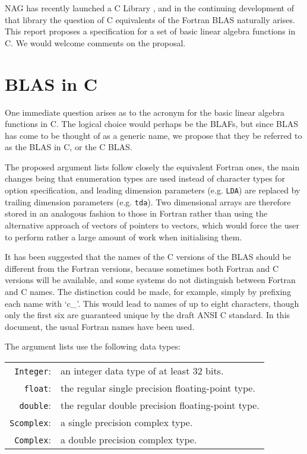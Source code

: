 NAG has recently launched a C Library \cite{CLIB}, and in the continuing
development of that library the question of C equivalents of the Fortran
BLAS naturally arises. This report proposes a specification for a set of
basic linear algebra functions in C.  We would welcome comments on the
proposal. 

\section{BLAS in C}
One immediate question arises as to the acronym for the basic linear
algebra functions in C.  The logical choice would perhaps be the BLAFs,
but since BLAS has come to be thought of as a generic name, we propose
that they be referred to as the BLAS in C, or the C BLAS. 

The proposed argument lists follow closely the equivalent Fortran ones,
the main changes being that enumeration types are used instead of
character types for option specification, and leading dimension
parameters (e.g. {\tt LDA}) are replaced by trailing dimension
parameters (e.g. {\tt tda}). Two dimensional arrays are therefore stored
in an analogous fashion to those in Fortran rather than using the
alternative approach of vectors of pointers to vectors, which would
force the user to perform rather a large amount of work when
initialising them. 

It has been suggested that the names of the C versions of the BLAS
should be different from the Fortran versions, because sometimes both
Fortran and C versions will be available, and some systems do not
distinguish between Fortran and C names. The distinction could be made,
for example, simply by prefixing each name with `c\_'. This would lead
to names of up to eight characters, though only the first six are
guaranteed unique by the draft ANSI C standard. In this document, the
usual Fortran names have been used. 

The argument lists use the following data types:

\begin{tabular}{rl}
{\tt Integer}:  &an integer data type of at least 32 bits. \\
{\tt float}:    &the regular single precision floating-point type. \\
{\tt double}:   &the regular double precision floating-point type. \\
{\tt Scomplex}: &a single precision complex type. \\
{\tt Complex}:  &a double precision complex type.
\end{tabular}

